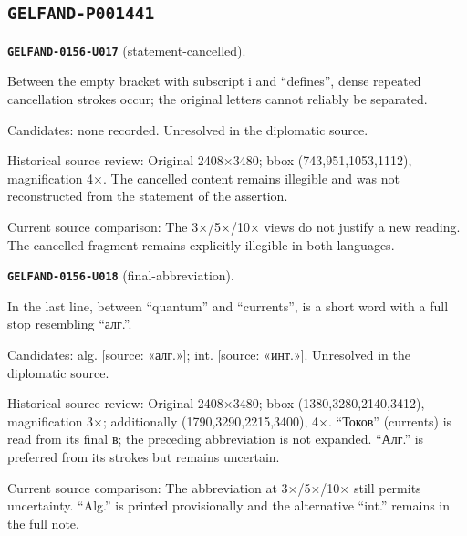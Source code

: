 \subsection*{\texttt{GELFAND-P001441}}
\par\noindent\leavevmode{}\label{GELFAND-0156-U017}\label{GELFAND-P001441:statement-cancelled}\textbf{\texttt{GELFAND-0156-U017}} (statement-cancelled).\nopagebreak[4]\par
Between the empty bracket with subscript i and “defines”, dense repeated cancellation strokes occur; the original letters cannot reliably be separated.\par
Candidates: none recorded. Unresolved in the diplomatic source.\par
Historical source review: Original 2408×3480; bbox (743,951,1053,1112), magnification 4×. The cancelled content remains illegible and was not reconstructed from the statement of the assertion.\par
Current source comparison: The 3×/5×/10× views do not justify a new reading. The cancelled fragment remains explicitly illegible in both languages.\par\medskip
\par\noindent\leavevmode{}\label{GELFAND-0156-U018}\label{GELFAND-P001441:final-abbreviation}\textbf{\texttt{GELFAND-0156-U018}} (final-abbreviation).\nopagebreak[4]\par
In the last line, between “quantum” and “currents”, is a short word with a full stop resembling “алг.”.\par
Candidates: alg. [source: «алг.»]; int. [source: «инт.»]. Unresolved in the diplomatic source.\par
Historical source review: Original 2408×3480; bbox (1380,3280,2140,3412), magnification 3×; additionally (1790,3290,2215,3400), 4×. “Токов” (currents) is read from its final в; the preceding abbreviation is not expanded. “Алг.” is preferred from its strokes but remains uncertain.\par
Current source comparison: The abbreviation at 3×/5×/10× still permits uncertainty. “Alg.” is printed provisionally and the alternative “int.” remains in the full note.\par\medskip
